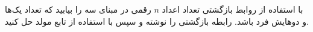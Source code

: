     \p 
با استفاده از روابط بازگشتی تعداد اعداد
$n$
رقمی در مبنای سه را بیابید که تعداد یک‌ها و دوهایش فرد باشد. رابطه بازگشتی را نوشته و سپس با استفاده از تابع مولد حل کنید.